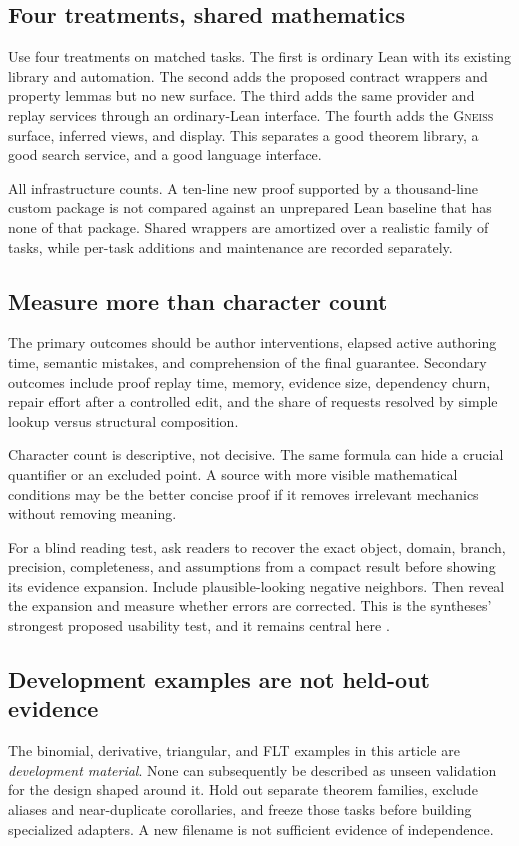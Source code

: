 \documentclass[11pt,letterpaper]{article}
\newcommand{\Gneiss}{\textsc{Gneiss}}
\theoremstyle{definition}
\theoremstyle{remark}
\begin{document}
\subsection{Four treatments, shared mathematics}
Use four treatments on matched tasks. The first is ordinary Lean with its
existing library and automation. The second adds the proposed contract wrappers
and property lemmas but no new surface. The third adds the same provider and
replay services through an ordinary-Lean interface. The fourth adds the
\Gneiss{} surface, inferred views, and display. This separates a good theorem
library, a good search service, and a good language interface.

All infrastructure counts. A ten-line new proof supported by a thousand-line
custom package is not compared against an unprepared Lean baseline that has
none of that package. Shared wrappers are amortized over a realistic family of
tasks, while per-task additions and maintenance are recorded separately.

\subsection{Measure more than character count}
The primary outcomes should be author interventions, elapsed active authoring
time, semantic mistakes, and comprehension of the final guarantee. Secondary
outcomes include proof replay time, memory, evidence size, dependency churn,
repair effort after a controlled edit, and the share of requests resolved by
simple lookup versus structural composition.

Character count is descriptive, not decisive. The same formula can hide a
crucial quantifier or an excluded point. A source with more visible mathematical
conditions may be the better concise proof if it removes irrelevant mechanics
without removing meaning.

For a blind reading test, ask readers to recover the exact object, domain,
branch, precision, completeness, and assumptions from a compact result before
showing its evidence expansion. Include plausible-looking negative neighbors.
Then reveal the expansion and measure whether errors are corrected. This is the
syntheses' strongest proposed usability test, and it remains central here
\cite{syn-a,syn-b}.

\subsection{Development examples are not held-out evidence}
The binomial, derivative, triangular, and FLT examples in this article are
\emph{development material}. None can subsequently be described as unseen
validation for the design shaped around it. Hold out separate theorem families,
exclude aliases and near-duplicate corollaries, and freeze those tasks before
building specialized adapters. A new filename is not sufficient evidence of
independence.
\end{document}
